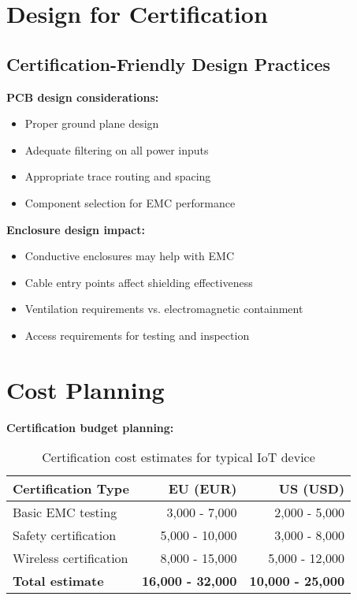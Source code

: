\section{Design for Certification}

\subsection{Certification-Friendly Design Practices}

\textbf{PCB design considerations:}
\begin{itemize}
\item Proper ground plane design
\item Adequate filtering on all power inputs
\item Appropriate trace routing and spacing
\item Component selection for EMC performance
\end{itemize}

\textbf{Enclosure design impact:}
\begin{itemize}
\item Conductive enclosures may help with EMC
\item Cable entry points affect shielding effectiveness
\item Ventilation requirements vs. electromagnetic containment
\item Access requirements for testing and inspection
\end{itemize}

\section{Cost Planning}

\textbf{Certification budget planning:}

\begin{table}[h]
\centering
\begin{tabular}{|l|r|r|}
\hline
\textbf{Certification Type} & \textbf{EU (EUR)} & \textbf{US (USD)} \\
\hline
Basic EMC testing & 3,000 - 7,000 & 2,000 - 5,000 \\
Safety certification & 5,000 - 10,000 & 3,000 - 8,000 \\
Wireless certification & 8,000 - 15,000 & 5,000 - 12,000 \\
\hline
\textbf{Total estimate} & \textbf{16,000 - 32,000} & \textbf{10,000 - 25,000} \\
\hline
\end{tabular}
\caption{Certification cost estimates for typical IoT device}
\end{table}


